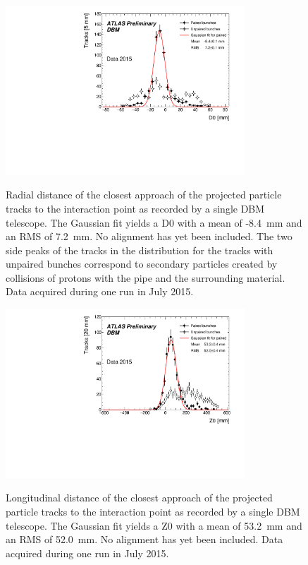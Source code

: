 \documentclass[twoside,11pt]{article}  %
\begin{document}
\baselineskip=15pt

\begin{figure}[!t]
\centering
\includegraphics[width=0.8\textwidth]{D0.pdf} \label{}
\caption{Radial distance of the closest approach of the projected particle tracks to the interaction point as recorded by a single DBM telescope. The Gaussian fit yields a D0 with a mean of -8.4~mm and an RMS of 7.2~mm. No alignment has yet been included. The two side peaks of the tracks in the distribution for the tracks with unpaired bunches correspond to secondary particles created by collisions of protons with the pipe and the surrounding material. Data acquired during one run in July 2015.}
\end{figure}

\begin{figure}[!t]
\centering
\includegraphics[width=0.8\textwidth]{Z0.pdf} \label{}
\caption{Longitudinal distance of the closest approach of the projected particle tracks to the interaction point as recorded by a single DBM telescope. The Gaussian fit yields a Z0 with a mean of 53.2~mm and an RMS of 52.0~mm. No alignment has yet been included. Data acquired during one run in July 2015.}
\end{figure}

\end{document}
